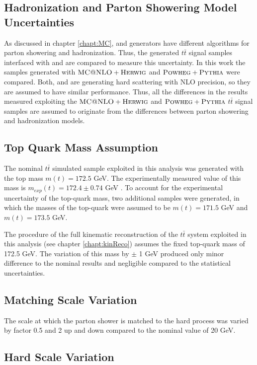 \subsection{Hadronization and Parton Showering Model Uncertainties}

As discussed in chapter \ref{chapt:MC}, \PYTHIA and \HERWIG generators have different algorithms for parton showering and hadronization.
Thus, the generated $t\bar{t}$ signal samples interfaced with \PYTHIA and \HERWIG are compared to measure this uncertainty. In this work
the samples generated with $\textsc{MC@NLO}+\textsc{Herwig}$ and $\textsc{Powheg}+\textsc{Pythia}$ were compared. Both, \MCNLO and \Powheg are generating hard scattering
with NLO precision, so they are assumed to have similar performance. Thus, all the differences in the results measured exploiting the
$\textsc{MC@NLO}+\textsc{Herwig}$ and $\textsc{Powheg}+\textsc{Pythia}$ $t\bar{t}$ signal samples are assumed to originate from the differences between parton showering
and hadronization models.

\subsection{Top Quark Mass Assumption}

The nominal $t\bar{t}$ simulated sample exploited in this analysis was generated with the top mass $m(t) = 172.5$ GeV. The experimentally measured
value of this mass is $m_{exp}(t) = 172.4 \pm 0.74$ GeV \cite{ATLAS:2014wva}. To account for the experimental uncertainty of the top-quark
mass, two additional samples were generated, in which the masses of the top-quark were assumed to be $m(t) = 171.5$ GeV and
$m(t) = 173.5$ GeV.

The procedure of the full kinematic reconstruction of the $t\bar{t}$ system exploited in this analysis (see chapter \ref{chapt:kinReco})
assumes the fixed top-quark mass of 172.5 GeV. The variation of this mass by $\pm$ 1 GeV produced only minor difference to the nominal
results and negligible compared to the statistical uncertainties.

\subsection{Matching Scale Variation}

The scale at which the parton shower is matched to the hard process was varied by factor 0.5 and 2 up and down compared to the nominal
value of 20 GeV.

\subsection{Hard Scale Variation}

